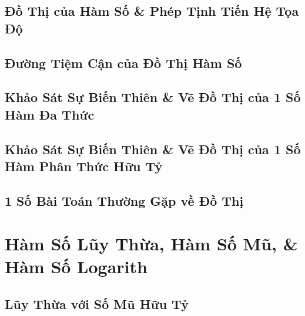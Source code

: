 \documentclass{article}
\numberwithin{equation}{section}
\begin{document}

\subsection{Đồ Thị của Hàm Số \& Phép Tịnh Tiến Hệ Tọa Độ}


\subsection{Đường Tiệm Cận của Đồ Thị Hàm Số}


\subsection{Khảo Sát Sự Biến Thiên \& Vẽ Đồ Thị của 1 Số Hàm Đa Thức}


\subsection{Khảo Sát Sự Biến Thiên \& Vẽ Đồ Thị của 1 Số Hàm Phân Thức Hữu Tỷ}


\subsection{1 Số Bài Toán Thường Gặp về Đồ Thị}


\section{Hàm Số Lũy Thừa, Hàm Số Mũ, \& Hàm Số Logarith}

\subsection{Lũy Thừa với Số Mũ Hữu Tỷ}

\end{document}

